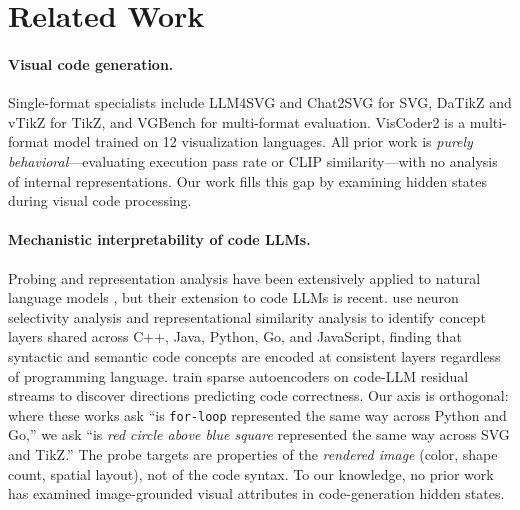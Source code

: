 
\section{Related Work}
\label{sec:related}

\paragraph{Visual code generation.}
Single-format specialists include LLM4SVG \cite{llm4svg2025} and Chat2SVG \cite{chat2svg2025} for SVG, DaTikZ \cite{datikz} and vTikZ \cite{vtikz2025} for TikZ, and VGBench \cite{vgbench2024} for multi-format evaluation.
VisCoder2 \cite{viscoder2} is a multi-format model trained on 12 visualization languages.
All prior work is \emph{purely behavioral}---evaluating execution pass rate or CLIP similarity---with no analysis of internal representations.
Our work fills this gap by examining hidden states during visual code processing.

\paragraph{Mechanistic interpretability of code LLMs.}
Probing and representation analysis have been extensively applied to natural language models \cite{belinkov-2022-probing}, but their extension to code LLMs is recent.
\citet{neuron-guided-2025} use neuron selectivity analysis and representational similarity analysis to identify concept layers shared across C++, Java, Python, Go, and JavaScript, finding that syntactic and semantic code concepts are encoded at consistent layers regardless of programming language.
\citet{sae-correctness-2025} train sparse autoencoders on code-LLM residual streams to discover directions predicting code correctness.
Our axis is orthogonal: where these works ask ``is \texttt{for-loop} represented the same way across Python and Go,'' we ask ``is \emph{red circle above blue square} represented the same way across SVG and TikZ.''
The probe targets are properties of the \emph{rendered image} (color, shape count, spatial layout), not of the code syntax.
To our knowledge, no prior work has examined image-grounded visual attributes in code-generation hidden states.

